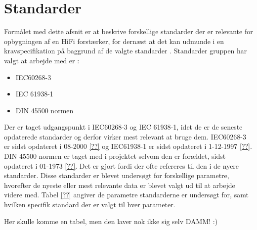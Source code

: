 \section{Standarder}
Formålet med dette afsnit er at beskrive forskellige standarder der er relevante for opbygningen af en HiFi forstærker, for dernæst at det kan udmunde i en kravspecifikation på baggrund af de valgte standarder . Standarder gruppen har valgt at arbejde med er :

\begin{itemize}
\item IEC60268-3              
\item IEC 61938-1             
\item DIN 45500 normen    
\end{itemize} 

Der er taget udgangspunkt i IEC60268-3 og IEC 61938-1, idet de er de seneste opdaterede standarder og derfor virker mest relevant at bruge dem. IEC60268-3 er sidst opdateret i 08-2000 \ref{??} og IEC61938-1 er sidst opdateret i 1-12-1997 \ref{??}. DIN 45500 normen er taget med i projektet selvom den er forældet, sidst opdateret i 01-1973 \ref{??}. Det er gjort fordi der ofte refereres til den i de nyere standarder. Disse standarder er blevet undersøgt for forskellige parametre, hvorefter de nyeste eller mest relevante data er blevet valgt ud til at arbejde videre med.
\newline
\newline
Tabel \ref{??} angiver de parametre standarderne er undersøgt for, samt hvilken specifik standard der er valgt til hver parameter.
 
Her skulle komme en tabel, men den laver nok ikke sig selv DAMM! :) 